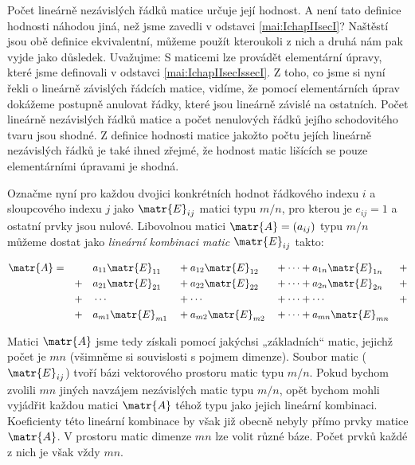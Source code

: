       
      
      Počet lineárně nezávislých řádků matice určuje její hodnost. A není tato definice hodnosti 
      náhodou jiná, než jsme zavedli v odstavci \ref{mai:IchapIIsecI}?  Naštěstí jsou obě definice 
      ekvivalentní, můžeme použít kteroukoli z nich a druhá nám pak vyjde jako důsledek. Uvažujme: 
      S maticemi lze provádět elementární úpravy, které jsme definovali v odstavci 
      \ref{mai:IchapIIsecIssecI}. Z toho, co jsme si nyní řekli o lineárně závislých řádcích matice, 
      vidíme, že pomocí elementárních úprav dokážeme postupně anulovat řádky, které jsou lineárně 
      závislé na ostatních. Počet lineárně nezávislých řádků matice a počet nenulových řádků jejího 
      schodovitého tvaru jsou shodné. Z definice hodnosti matice jakožto počtu jejích lineárně 
      nezávislých řádků je také ihned zřejmé, že hodnost matic lišících se pouze elementárními 
      úpravami je shodná.
      
      Označme nyní pro každou dvojici konkrétních hodnot řádkového indexu \(i\) a sloupcového 
      indexu \(j\) jako \(\matr{E}_{ij}\) matici typu \(m/n\), pro kterou je \(e_{ij} = 1\) a 
      ostatní prvky jsou nulové. Libovolnou matici \(\matr{A} = (a_{ij})\) typu \(m/n\) můžeme 
      dostat jako \emph{lineární kombinaci matic} \(\matr{E}_{ij}\) takto:
      
      \begin{alignat*}{7}
        \matr{A} 
          &= &&  &&a_{11}\matr{E}_{11} &&+ a_{12}\matr{E}_{12} &&+\cdots+ a_{1n}\matr{E}_{1n} &&+\\
          &  &&+ &&a_{21}\matr{E}_{21} &&+ a_{22}\matr{E}_{22} &&+\cdots+ a_{2n}\matr{E}_{2n} &&+\\
          &  &&+ &&\cdots              &&+\cdots               &&+\cdots+ \cdots              &&+\\
          &  &&+ &&a_{m1}\matr{E}_{m1} &&+ a_{m2}\matr{E}_{m2} &&+\cdots+ a_{mn}\matr{E}_{mn} &&
      \end{alignat*}
      
      Matici \(\matr{A}\) jsme tedy získali pomocí jakýchsi „základních“ matic, jejichž počet je 
      \(mn\) (všimněme si souvislosti s pojmem dimenze). Soubor matic (\(\matr{E}_{ij}\)) tvoří 
      bázi vektorového prostoru matic typu \(m/n\). Pokud bychom zvolili \(mn\) jiných navzájem 
      nezávislých matic typu \(m/n\), opět bychom mohli vyjádřit každou matici \(\matr{A}\) téhož 
      typu jako jejich lineární kombinaci. Koeficienty této lineární kombinace by však již obecně 
      nebyly přímo prvky matice \(\matr{A}\). V prostoru matic dimenze \(mn\) lze volit různé báze. 
      Počet prvků každé z nich je však vždy \(mn\).
      
